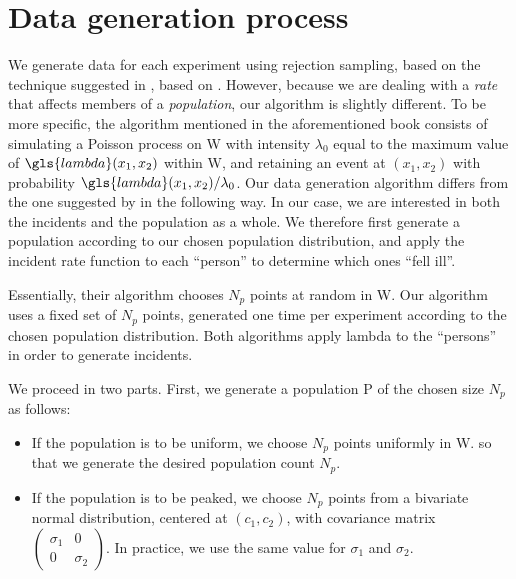 \section{Data generation process}
\label{sec:theory:data}

We generate data for each experiment using rejection sampling,
based on the technique suggested in ,
based on \citet{lewis1979simulation}.
However,
because we are dealing with a \textit{rate} that affects members of a \textit{population},
our algorithm is slightly different.
To be more specific,
the algorithm mentioned in the aforementioned book consists of simulating a Poisson process on \gls{W}
with intensity $\lambda_0$ equal to the maximum value of $\gls{lambda}(x_1, x_2)$ within \gls{W},
and retaining an event at $(x_1, x_2)$ with
probability $\gls{lambda}(x_1, x_2)/\lambda_0$.
Our data generation algorithm differs from the one suggested by \citet{lewis1979simulation} in the following way.
In our case,
we are interested in both the \glspl{incident} and the population as a whole.
We therefore first generate a population according to our chosen population distribution,
and apply the \gls{incident} rate function to each ``person'' to determine which ones ``fell ill''.

Essentially, their algorithm chooses $N_p$ points at random in \gls{W}.
Our algorithm uses a fixed set of $N_p$ points, generated one time per experiment according to the chosen population distribution.
Both algorithms apply \gls{lambda} to the ``persons'' in order to generate incidents.

We proceed in two parts.
First, we generate a population \gls{P} of the chosen size $N_p$ as follows:
\begin{itemize}
    \item If the population is to be uniform,
            we choose $N_p$ points uniformly in \gls{W}.
        so that we generate the desired population count $N_p$.
    \item If the population is to be peaked,
            we choose $N_p$ points from a bivariate normal distribution,
            centered at $(c_1, c_2)$,
            with covariance matrix
            $\begin{pmatrix}
                \sigma_1 & 0 \\
                0 & \sigma_2
            \end{pmatrix}$.
            In practice, we use the same value for $\sigma_1$ and $\sigma_2$.
\end{itemize}


